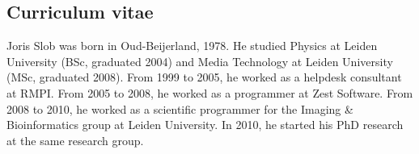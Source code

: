 \documentclass[11pt, a4paper, oneside]{Thesis} %
\begin{document}

\begin{titlepage}
\chapter{Curriculum vitae}
Joris Slob was born in Oud-Beijerland, 1978. He studied Physics at
Leiden University (BSc, graduated 2004) and Media Technology at Leiden
University (MSc, graduated 2008). From 1999 to 2005, he worked as a
helpdesk consultant at RMPI. From 2005 to 2008, he worked as a
programmer at Zest Software. From 2008 to 2010, he worked as a
scientific programmer for the Imaging \& Bioinformatics group at
Leiden University. In 2010, he started his PhD research at the same
research group.
\end{titlepage}
\end{document}
